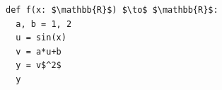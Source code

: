 \documentclass[border=10pt]{standalone}
\begin{document}
\begin{lstlisting}
def f(x: $\mathbb{R}$) $\to$ $\mathbb{R}$:
  a, b = 1, 2
  u = sin(x)
  v = a*u+b
  y = v$^2$
  y
\end{lstlisting}
\end{document}
